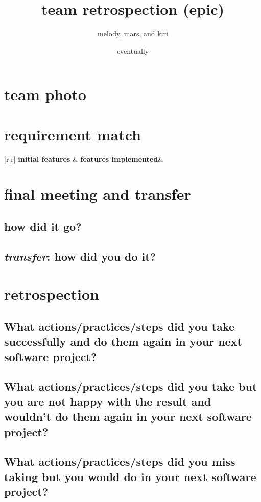 \documentclass[12pt, letterpaper]{article}
\title{team retrospection (epic)}
\date{eventually}
\author{melody, mars, and kiri}
\begin{document}
\maketitle
\section{team photo}

\section{requirement match}
\begin{table}[h!]
\center
\begin{tabular}{|r|r|}\hline
	\textbf{initial features} & \textbf{features implemented}&\hline
\end{tabular}
\end{table}

\section{final meeting and transfer}
\subsection{how did it go?}

\subsection{\emph{transfer}: how did you do it?}

\section{retrospection}
\subsection{What actions/practices/steps did you take successfully and do them again in your next software project?}

\subsection{What actions/practices/steps did you take but you are not happy with the result and wouldn't do them again in your next software project?}

\subsection{What actions/practices/steps did you miss taking but you would do in your next software project?}
\end{document}
